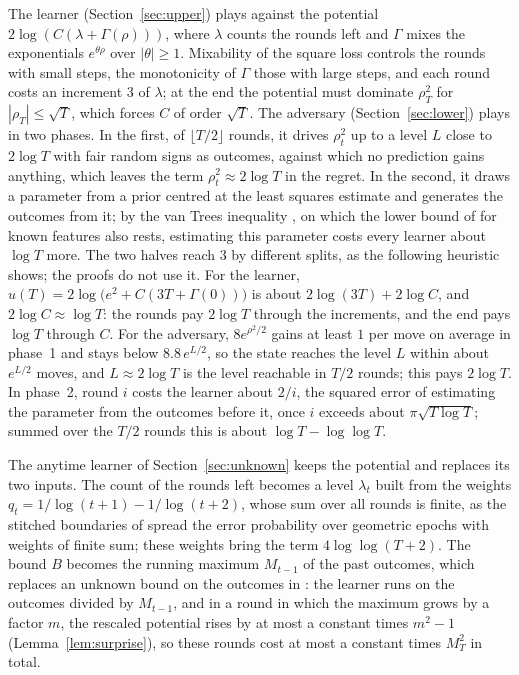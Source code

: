 \documentclass[12pt]{amsart}
\theoremstyle{definition}
\numberwithin{equation}{section}
\begin{document}
The learner (Section~\ref{sec:upper}) plays against the potential $2\log(C(\lambda+\Gamma(\rho)))$, where $\lambda$ counts the rounds left and $\Gamma$ mixes the exponentials $e^{\theta\rho}$ over $|\theta|\ge1$. Mixability of the square loss \citetext{\citealp[Section~2, Example~4]{Vovk98}; \citealp[Example~3.13]{HKW}; \citealp[Section~2.4, Lemma~2]{Vovk01}} controls the rounds with small steps, the monotonicity of $\Gamma$ those with large steps, and each round costs an increment $3$ of $\lambda$; at the end the potential must dominate $\rho_T^2$ for $|\rho_T|\le\sqrt T$, which forces $C$ of order $\sqrt T$. The adversary (Section~\ref{sec:lower}) plays in two phases. In the first, of $\lfloor T/2\rfloor$ rounds, it drives $\rho_t^2$ up to a level $L$ close to $2\log T$ with fair random signs as outcomes, against which no prediction gains anything, which leaves the term $\rho_t^2\approx2\log T$ in the regret. In the second, it draws a parameter from a prior centred at the least squares estimate and generates the outcomes from it; by the van Trees inequality \citep[Section~2, inequality~(3)]{GL}, on which the lower bound of \citet[Theorem~4]{GaillardALT19} for known features also rests, estimating this parameter costs every learner about $\log T$ more. The two halves reach $3$ by different splits, as the following heuristic shows; the proofs do not use it. For the learner, $u(T)=2\log\bigl(e^2+C(3T+\Gamma(0))\bigr)$ is about $2\log(3T)+2\log C$, and $2\log C\approx\log T$: the rounds pay $2\log T$ through the increments, and the end pays $\log T$ through $C$. For the adversary, $8e^{\rho^2/2}$ gains at least $1$ per move on average in phase~1 and stays below $8.8\,e^{L/2}$, so the state reaches the level $L$ within about $e^{L/2}$ moves, and $L\approx2\log T$ is the level reachable in $T/2$ rounds; this pays $2\log T$. In phase~2, round $i$ costs the learner about $2/i$, the squared error of estimating the parameter from the outcomes before it, once $i$ exceeds about $\pi\sqrt{T\log T}$; summed over the $T/2$ rounds this is about $\log T-\log\log T$.

The anytime learner of Section~\ref{sec:unknown} keeps the potential and replaces its two inputs. The count of the rounds left becomes a level $\lambda_t$ built from the weights $q_t=1/\log(t+1)-1/\log(t+2)$, whose sum over all rounds is finite, as the stitched boundaries of \citet[Theorem~1]{Howard21} spread the error probability over geometric epochs with weights of finite sum; these weights bring the term $4\log\log(T+2)$. The bound $B$ becomes the running maximum $M_{t-1}$ of the past outcomes, which replaces an unknown bound on the outcomes in \citet[Section~3.2]{Gerchinovitz13}: the learner runs on the outcomes divided by $M_{t-1}$, and in a round in which the maximum grows by a factor $m$, the rescaled potential rises by at most a constant times $m^2-1$ (Lemma~\ref{lem:surprise}), so these rounds cost at most a constant times $M_T^2$ in total.
\end{document}
